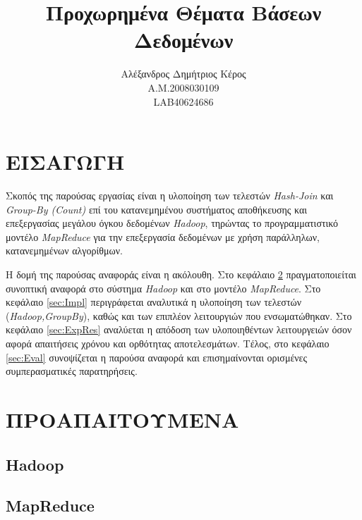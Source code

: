 \documentclass{article}
\newcommand{\en}[1]{\foreignlanguage{english}{#1}}
\begin{document}
\title{Προχωρημένα Θέματα Βάσεων Δεδομένων}
\author{Αλέξανδρος Δημήτριος Κέρος\\
	A.M.2008030109\\
	\foreignlanguage{english} {LAB40624686}}
\date{}
\maketitle

\newpage
\tableofcontents

\newpage

\section{ΕΙΣΑΓΩΓΗ} \label{sec:Intro}

Σκοπός της παρούσας εργασίας είναι η υλοποίηση των τελεστών \emph{\en{Hash-Join}} και \emph{\en{Group-By (Count)}} επί του κατανεμημένου συστήματος αποθήκευσης και επεξεργασίας μεγάλου όγκου δεδομένων \emph{\en{Hadoop}}, τηρώντας το προγραμματιστικό μοντέλο \emph{\en{MapReduce}} για την επεξεργασία δεδομένων με χρήση παράλληλων, κατανεμημένων αλγορίθμων.

Η δομή της παρούσας αναφοράς είναι η ακόλουθη. Στο κεφάλαιο \ref{sec:Prelim} πραγματοποιείται συνοπτική αναφορά στο σύστημα \emph{\en{Hadoop}} και στο μοντέλο \emph{\en{MapReduce}}. Στο κεφάλαιο \ref{sec:Impl} περιγράφεται αναλυτικά η υλοποίηση των τελεστών (\emph{\en{Hadoop,GroupBy}}), καθώς και των επιπλέον λειτουργιών που ενσωματώθηκαν. Στο κεφάλαιο \ref{sec:ExpRes} αναλύεται η απόδοση των υλοποιηθέντων λειτουργειών όσον αφορά απαιτήσεις χρόνου και ορθότητας αποτελεσμάτων. Τέλος, στο κεφάλαιο \ref{sec:Eval} συνοψίζεται η παρούσα αναφορά και επισημαίνονται ορισμένες συμπερασματικές παρατηρήσεις.

\section{ΠΡΟΑΠΑΙΤΟΥΜΕΝΑ} \label{sec:Prelim}

\subsection{\en{Hadoop}} \label{subsec:Hadoop}

\subsection{\en{MapReduce}} \label{subsec:Mapreduce}
\end{document}
